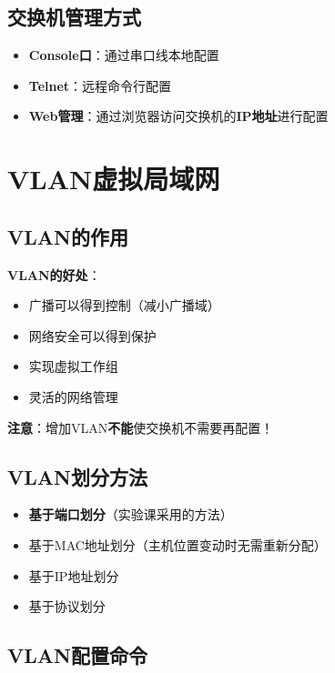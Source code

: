 \documentclass[12pt,a4paper]{ctexart}
\begin{document}
\subsection{交换机管理方式}

\begin{itemize}[leftmargin=2em,itemsep=0pt]
    \item \textbf{Console口}：通过串口线本地配置
    \item \textbf{Telnet}：远程命令行配置
    \item \textbf{Web管理}：通过浏览器访问交换机的\textbf{IP地址}进行配置
\end{itemize}

\section{VLAN虚拟局域网}

\subsection{VLAN的作用}

\begin{keybox}
\textbf{VLAN的好处}：
\begin{itemize}[itemsep=0pt]
    \item 广播可以得到控制（减小广播域）
    \item 网络安全可以得到保护
    \item 实现虚拟工作组
    \item 灵活的网络管理
\end{itemize}
\textbf{注意}：增加VLAN\textbf{不能}使交换机不需要再配置！
\end{keybox}

\subsection{VLAN划分方法}

\begin{itemize}[leftmargin=2em,itemsep=0pt]
    \item \textbf{基于端口划分}（实验课采用的方法）
    \item 基于MAC地址划分（主机位置变动时无需重新分配）
    \item 基于IP地址划分
    \item 基于协议划分
\end{itemize}

\subsection{VLAN配置命令}
\end{document}
